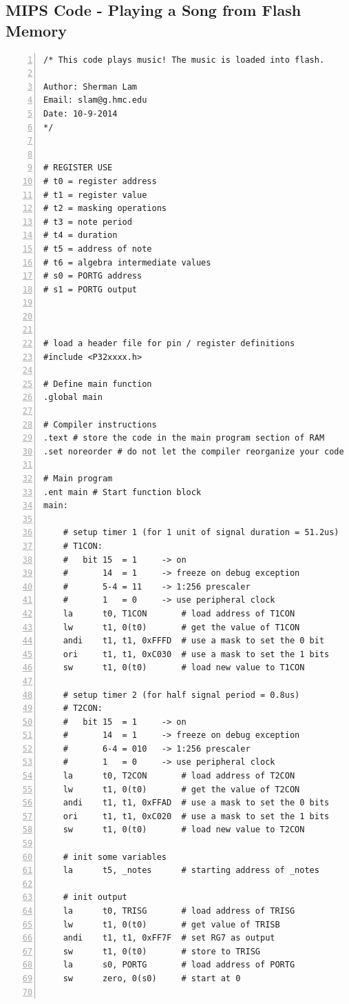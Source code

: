 \documentclass[11pt]{article}
\begin{document}
\subsection{MIPS Code - Playing a Song from Flash Memory}

\begin{lstlisting}[numbers=left,basicstyle=\footnotesize]
/* This code plays music! The music is loaded into flash.

Author: Sherman Lam
Email: slam@g.hmc.edu
Date: 10-9-2014
*/


# REGISTER USE
# t0 = register address
# t1 = register value
# t2 = masking operations
# t3 = note period
# t4 = duration
# t5 = address of note
# t6 = algebra intermediate values
# s0 = PORTG address
# s1 = PORTG output



# load a header file for pin / register definitions
#include <P32xxxx.h>

# Define main function
.global main

# Compiler instructions
.text # store the code in the main program section of RAM
.set noreorder # do not let the compiler reorganize your code

# Main program
.ent main # Start function block
main:

    # setup timer 1 (for 1 unit of signal duration = 51.2us)
    # T1CON:
    #   bit 15  = 1     -> on
    #       14  = 1     -> freeze on debug exception
    #       5-4 = 11    -> 1:256 prescaler
    #       1   = 0     -> use peripheral clock
    la      t0, T1CON       # load address of T1CON
    lw      t1, 0(t0)       # get the value of T1CON
    andi    t1, t1, 0xFFFD  # use a mask to set the 0 bit
    ori     t1, t1, 0xC030  # use a mask to set the 1 bits
    sw      t1, 0(t0)       # load new value to T1CON

    # setup timer 2 (for half signal period = 0.8us)
    # T2CON:
    #   bit 15  = 1     -> on
    #       14  = 1     -> freeze on debug exception
    #       6-4 = 010   -> 1:256 prescaler
    #       1   = 0     -> use peripheral clock
    la      t0, T2CON       # load address of T2CON
    lw      t1, 0(t0)       # get the value of T2CON
    andi    t1, t1, 0xFFAD  # use a mask to set the 0 bits
    ori     t1, t1, 0xC020  # use a mask to set the 1 bits
    sw      t1, 0(t0)       # load new value to T2CON

    # init some variables
    la      t5, _notes      # starting address of _notes

    # init output
    la      t0, TRISG       # load address of TRISG
    lw      t1, 0(t0)       # get value of TRISB
    andi    t1, t1, 0xFF7F  # set RG7 as output
    sw      t1, 0(t0)       # store to TRISG
    la      s0, PORTG       # load address of PORTG
    sw      zero, 0(s0)     # start at 0


\end{lstlisting}
\end{document}
